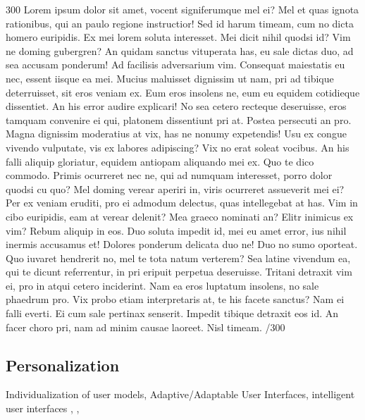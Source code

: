 \documentclass{sigchi}
\begin{document}
300 Lorem ipsum dolor sit amet, vocent signiferumque mel ei? Mel et quas ignota rationibus, qui an paulo regione instructior! Sed id harum timeam, cum no dicta homero euripidis. Ex mei lorem soluta interesset. Mei dicit nihil quodsi id? Vim ne doming gubergren? An quidam sanctus vituperata has, eu sale dictas duo, ad sea accusam ponderum! Ad facilisis adversarium vim. Consequat maiestatis eu nec, essent iisque ea mei. Mucius maluisset dignissim ut nam, pri ad tibique deterruisset, sit eros veniam ex. Eum eros insolens ne, eum eu equidem cotidieque dissentiet. An his error audire explicari! No sea cetero recteque deseruisse, eros tamquam convenire ei qui, platonem dissentiunt pri at. Postea persecuti an pro. Magna dignissim moderatius at vix, has ne nonumy expetendis! Usu ex congue vivendo vulputate, vis ex labores adipiscing? Vix no erat soleat vocibus. An his falli aliquip gloriatur, equidem antiopam aliquando mei ex. Quo te dico commodo. Primis ocurreret nec ne, qui ad numquam interesset, porro dolor quodsi cu quo? Mel doming verear aperiri in, viris ocurreret assueverit mei ei? Per ex veniam eruditi, pro ei admodum delectus, quas intellegebat at has. Vim in cibo euripidis, eam at verear delenit? Mea graeco nominati an? Elitr inimicus ex vim? Rebum aliquip in eos. Duo soluta impedit id, mei eu amet error, ius nihil inermis accusamus et! Dolores ponderum delicata duo ne! Duo no sumo oporteat. Quo iuvaret hendrerit no, mel te tota natum verterem? Sea latine vivendum ea, qui te dicunt referrentur, in pri eripuit perpetua deseruisse. Tritani detraxit vim ei, pro in atqui cetero inciderint. Nam ea eros luptatum insolens, no sale phaedrum pro. Vix probo etiam interpretaris at, te his facete sanctus? Nam ei falli everti. Ei cum sale pertinax senserit. Impedit tibique detraxit eos id. An facer choro pri, nam ad minim causae laoreet. Nisl timeam. /300

\subsection{Personalization}
Individualization of user models, Adaptive/Adaptable User Interfaces, intelligent user interfaces
\cite{bunt04}, \cite{findlater04}, \cite{brusi96}
\end{document}
